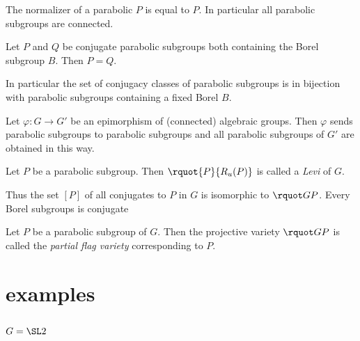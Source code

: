 \documentclass[english, no-theorem-numbers]{short-notes}
\begin{document}
\begin{Prop}
    The normalizer of a parabolic $P$ is equal to $P$. 
    In particular all parabolic subgroups are connected.
\end{Prop}

\begin{Prop}
    Let $P$ and $Q$ be conjugate parabolic subgroups both containing the Borel subgroup $B$.
    Then $P = Q$.

    In particular the set of conjugacy classes of parabolic subgroups is in bijection with parabolic subgroups containing a fixed Borel $B$.
\end{Prop}

\begin{Prop}
    Let $φ\colon G → G'$ be an epimorphism of (connected) algebraic groups.
    Then $φ$ sends parabolic subgroups to parabolic subgroups and all parabolic subgroups of $G'$ are obtained in this way.
\end{Prop}

\begin{Def}
    Let $P$ be a parabolic subgroup.
    Then $\rquot{P}{R_u(P)}$ is called a \emph{Levi} of $G$.
\end{Def}

Thus the set $[P]$ of all conjugates to $P$ in $G$ is isomorphic to $\rquot GP$.
Every Borel subgroups is conjugate

\begin{Def}
    Let $P$ be a parabolic subgroup of $G$.
    Then the projective variety $\rquot GP$ is called the \emph{partial flag variety} corresponding to $P$.
\end{Def}



\section*{examples}

\subsection*{\texorpdfstring{$G = \SL2$}{G = SL2}}
\end{document}
